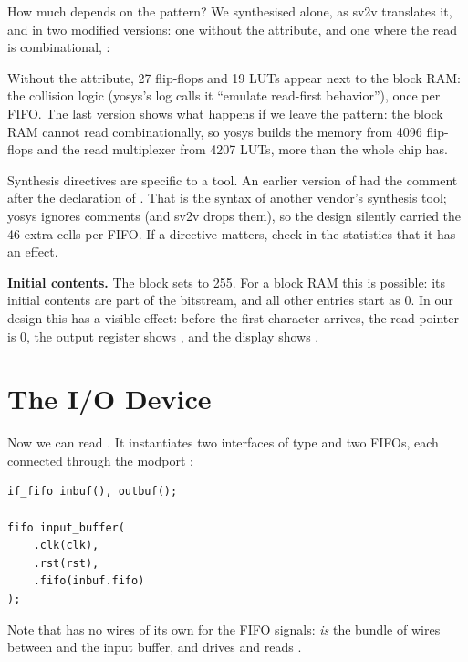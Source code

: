 How much depends on the pattern? We synthesised  alone, as
sv2v translates it, and in two modified versions: one without the attribute,
and one where the read is combinational, :


Without the attribute, 27 flip-flops and 19 LUTs appear next to the block
RAM: the collision logic (yosys's log calls it ``emulate read-first
behavior''), once per FIFO. The last version shows what happens if we leave
the pattern: the block RAM cannot read combinationally, so yosys builds the
memory from 4096 flip-flops and the read multiplexer from 4207 LUTs, more
than the whole chip has.

\begin{pitfall}
Synthesis directives are specific to a tool. An earlier version of
 had the comment
 after the declaration of
. That is the syntax of another vendor's synthesis tool; yosys
ignores comments (and sv2v drops them), so the design silently carried the
46 extra cells per FIFO. If a directive matters, check in the statistics that
it has an effect.
\end{pitfall}

\textbf{Initial contents.} The  block sets  to 255.
For a block RAM this is possible: its initial contents are part of the
bitstream, and all other entries start as 0. In our design this has a visible
effect: before the first character arrives, the read pointer is 0, the output
register shows , and the display shows .

\section{The I/O Device}
\label{sec:step07-devio}

Now we can read . It instantiates two interfaces of type
 and two FIFOs, each connected through the modport :
\begin{lstlisting}
if_fifo inbuf(), outbuf();

fifo input_buffer(
    .clk(clk),
    .rst(rst),
    .fifo(inbuf.fifo)
);
\end{lstlisting}
Note that  has no wires of its own for the FIFO signals: 
\emph{is} the bundle of wires between  and the input buffer, and
 drives  and reads .

